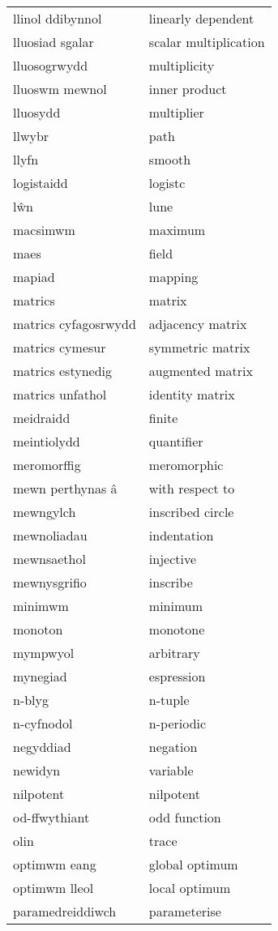 \begin{supertabular}{p{0.22\textwidth}p{0.22\textwidth}}
llinol ddibynnol & linearly dependent \\
lluosiad sgalar & scalar multiplication \\
lluosogrwydd & multiplicity \\
lluoswm mewnol & inner product \\
lluosydd & multiplier \\
llwybr & path \\
llyfn & smooth \\
logistaidd & logistc \\
lŵn & lune \\
macsimwm & maximum \\
maes & field \\
mapiad & mapping \\
matrics & matrix \\
matrics cyfagosrwydd & adjacency matrix \\
matrics cymesur & symmetric matrix \\
matrics estynedig & augmented matrix \\
matrics unfathol & identity matrix \\
meidraidd & finite \\
meintiolydd & quantifier \\
meromorffig & meromorphic \\
mewn perthynas â & with respect to \\
mewngylch & inscribed circle \\
mewnoliadau & indentation \\
mewnsaethol & injective \\
mewnysgrifio & inscribe \\
minimwm & minimum \\
monoton & monotone \\
mympwyol & arbitrary \\
mynegiad & espression \\
n-blyg & n-tuple \\
n-cyfnodol & n-periodic \\
negyddiad & negation \\
newidyn & variable \\
nilpotent & nilpotent \\
od-ffwythiant & odd function \\
olin & trace \\
optimwm eang & global optimum \\
optimwm lleol & local optimum \\
paramedreiddiwch & parameterise \\

\end{supertabular}
